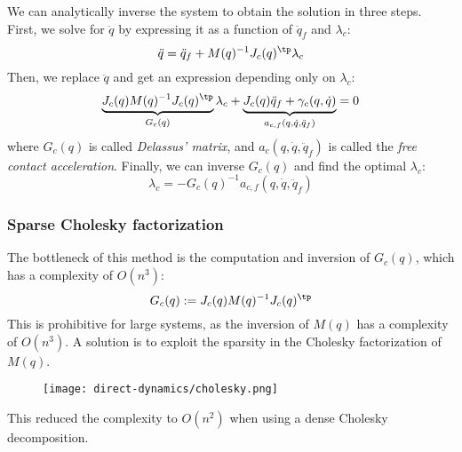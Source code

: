 We can analytically inverse the system to obtain the solution in three steps. First, we solve for $\ddot{q}$ by expressing it as a function of $\ddot{q}_f$ and $\lambda_c$:
\begin{equation*}
    \ddot{q} = \ddot{q}_f + M(q)^{-1}J_c(q)^\tp\lambda_c
\end{equation*}
Then, we replace $\ddot{q}$ and get an expression depending only on $\lambda_c$:
\begin{equation*}
    \underbrace{
        J_c(q)M(q)^{-1}J_c(q)^\tp
    }_{G_c(q)}\lambda_c
    + \underbrace{
        J_c(q)\ddot{q}_f + \gamma_c(q, \dot{q})
    }_{a_{c, f}(q, \dot{q}, \ddot{q}_f)}
    = 0
\end{equation*}
where $G_c(q)$ is called \emph{Delassus' matrix}, and $a_c(q, \dot{q}, \ddot{q}_f)$ is called the \emph{free contact acceleration}. Finally, we can inverse $G_c(q)$ and find the optimal $\lambda_c$:
\begin{equation*}
    \lambda_c = -G_c(q)^{-1}a_{c, f}(q, \dot{q}, \ddot{q}_f)
\end{equation*}

\subsubsection{Sparse Cholesky factorization}
The bottleneck of this method is the computation and inversion of $G_c(q)$, which has a complexity of $O(n^3)$:
\begin{equation*}
    G_c(q) := J_c(q)M(q)^{-1}J_c(q)^\tp
\end{equation*}
This is prohibitive for large systems, as the inversion of $M(q)$ has a complexity of $O(n^3)$. A solution is to exploit the sparsity in the Cholesky factorization of $M(q)$.
\begin{figure}[H]
    \centering
    \texttt{[image: direct-dynamics/cholesky.png]}
\end{figure}
This reduced the complexity to $O(n^2)$ when using a dense Cholesky decomposition.

